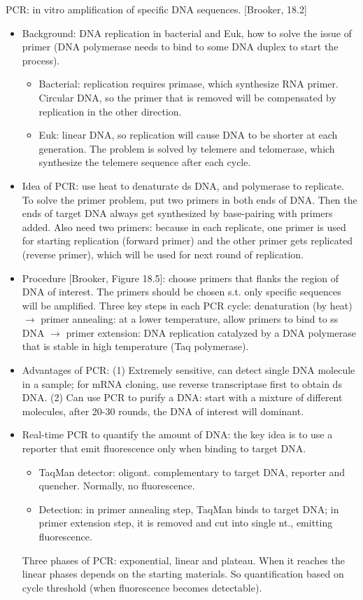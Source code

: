 \documentclass{report}
\begin{document}
PCR: in vitro amplification of specific DNA sequences. [Brooker, 18.2]
\begin{itemize}
	\item Background: DNA replication in bacterial and Euk, how to solve the issue of primer (DNA polymerase needs to bind to some DNA duplex to start the process).  
	\begin{itemize}
		\item Bacterial: replication requires primase, which synthesize RNA primer. Circular DNA, so the primer that is removed will be compensated by replication in the other direction.  
		\item Euk: linear DNA, so replication will cause DNA to be shorter at each generation. The problem is solved by telemere and telomerase, which synthesize the telemere sequence after each cycle. 
	\end{itemize}
	
	\item Idea of PCR: use heat to denaturate ds DNA, and polymerase to replicate. To solve the primer problem, put two primers in both ends of DNA. Then the ends of target DNA always get synthesized by base-pairing with primers added. Also need two primers: because in each replicate, one primer is used for starting replication (forward primer) and the other primer gets replicated (reverse primer), which will be used for next round of replication. 
	
	\item Procedure [Brooker, Figure 18.5]: choose primers that flanks the region of DNA of interest. The primers should be chosen s.t. only specific sequences will be amplified. Three key steps in each PCR cycle: denaturation (by heat) $\rightarrow$ primer annealing: at a lower temperature, allow primers to bind to ss DNA $\rightarrow$ primer extension: DNA replication catalyzed by a DNA polymerase that is stable in high temperature (Taq polymerase). 
	 
	\item Advantages of PCR: (1) Extremely sensitive, can detect single DNA molecule in a sample; for mRNA cloning, use reverse transcriptase first to obtain ds DNA. (2) Can use PCR to purify a DNA: start with a mixture of different molecules, after 20-30 rounds, the DNA of interest will dominant. 
	
	\item Real-time PCR to quantify the amount of DNA: the key idea is to use a reporter that emit fluorescence only when binding to target DNA. 
	\begin{itemize}
		\item TaqMan detector: oligont. complementary to target DNA, reporter and quencher. Normally, no fluorescence. 
		\item Detection: in primer annealing step, TaqMan binds to target DNA; in primer extension step, it is removed and cut into single nt., emitting fluorescence. 
	\end{itemize}
	Three phases of PCR: exponential, linear and plateau. When it reaches the linear phases depends on the starting materials. So quantification based on cycle threshold (when fluorescence becomes detectable).  
\end{itemize}
\end{document}

